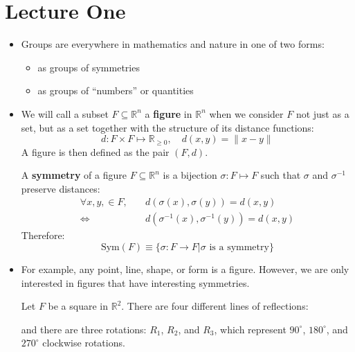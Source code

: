 \section{Lecture One}
\begin{itemize}
    \item Groups are everywhere in mathematics and nature in one of two forms:
    \begin{itemize}
        \item as groups of symmetries
        \item as groups of ``numbers'' or quantities
    \end{itemize}
    \item We will call a subset $F \subseteq \mathbb{R}^n$ a \textbf{figure} in $\mathbb{R}^n$ when we consider $F$ not just as a set, but as a set together with the structure of its distance functions:
    \begin{equation}
        d: F \times F \mapsto \mathbb{R}_{\ge 0},\quad d(x,y) = \lVert x-y \rVert
    \end{equation}
    A figure is then defined as the pair $(F,d)$.
    \begin{definition}
        A \textbf{symmetry} of a figure $F \subseteq \mathbb{R}^n$ is a bijection $\sigma: F \mapsto F$ such that $\sigma$ and $\sigma^{-1}$ preserve distances:
        \begin{align}
            \forall x,y, \in F,\quad& d(\sigma(x),\sigma(y))=d(x,y) \\ 
            \iff & d(\sigma^{-1}(x), \sigma^{-1}(y)) = d(x,y)
        \end{align}
        Therefore:
        \begin{equation}
            \text{Sym}(F) \equiv \{\sigma: F\to F | \sigma\text{ is a symmetry}\}
        \end{equation}
    \end{definition}
    \item For example, any point, line, shape, or form is a figure. However, we are only interested in figures that have interesting symmetries.
    \begin{example}
        Let $F$ be a square in $\mathbb{R}^2$. There are four different lines of reflections:
        \begin{center}
        \end{center}
        and there are three rotations: $R_1$, $R_2$, and $R_3$, which represent $90^\circ$, $180^\circ$, and $270^\circ$ clockwise rotations.
        \vspace{2mm}


\end{example}
\end{itemize}
